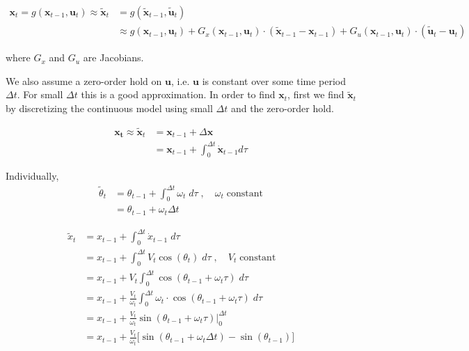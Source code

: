 \documentclass{article}
\begin{document}
\begin{enumerate}[label=(\roman*)]
\begin{equation}
\begin{aligned}
\mathbf{x}_t = g(\mathbf{x}_{t-1}, \mathbf{u}_t) \approx \tilde{\mathbf{x}}_t &= g(\tilde{\mathbf{x}}_{t-1}, \tilde{\mathbf{u}}_t) \\
&\approx g(\mathbf{x}_{t-1}, \mathbf{u}_t)
+ G_x(\mathbf{x}_{t-1}, \mathbf{u}_t)\cdot (\tilde{\mathbf{x}}_{t-1} - \mathbf{x}_{t-1})
+ G_u(\mathbf{x}_{t-1}, \mathbf{u}_t)\cdot (\tilde{\mathbf{u}}_t - \mathbf{u}_t)
\end{aligned}
\end{equation}

where $G_x$ and $G_u$ are Jacobians.

We also assume a zero-order hold on $\mathbf u$, i.e. $\mathbf{u}$ is constant over some time period $\Delta t$. For small $\Delta t$ this is a good approximation. In order to find $\mathbf{x}_t$, first we find $\tilde{\mathbf{x}}_t$ by discretizing the continuous model using small $\Delta t$ and the zero-order hold.

\begin{equation}
\begin{aligned}
\mathbf{x_t} \approx \tilde{\mathbf{x}}_t &= \mathbf{x}_{t-1} + \Delta \mathbf{x} \\
&= \mathbf{x}_{t-1} + \int_0^{\Delta t} \mathbf{\dot x}_{t-1} d\tau
\end{aligned}
\end{equation}

Individually,
\begin{equation}
\begin{aligned}
\tilde \theta_t &= \theta_{t-1} + \int_0^{\Delta t} \omega_t \; d\tau \;,\quad \omega_t \; \text{constant} \\
&= \theta_{t-1} + \omega_t \Delta t
\end{aligned}
\end{equation}

\begin{equation}
\begin{aligned}
\tilde x_t &= x_{t-1} + \int_0^{\Delta t} \dot{x}_{t-1} \; d\tau \\
&= x_{t-1} + \int_0^{\Delta t} V_t \cos(\theta_t) \; d\tau \;,\quad V_t \; \text{constant} \\
&= x_{t-1} + V_t \int_0^{\Delta t} \cos(\theta_{t-1} + \omega_t\tau) \; d\tau \\
&= x_{t-1} + \frac{V_t}{\omega_t} \int_0^{\Delta t} \omega_t \cdot \cos(\theta_{t-1} + \omega_t\tau) \; d\tau \\
&= x_{t-1} + \frac{V_t}{\omega_t} \sin(\theta_{t-1} + \omega_t\tau) \Big \rvert_0^{\Delta t} \\
&= x_{t-1} + \frac{V_t}{\omega_t} \Big[ \sin(\theta_{t-1} + \omega_t\Delta t) - \sin(\theta_{t-1}) \Big]
\end{aligned}
\end{equation}


\end{enumerate}
\end{document}
